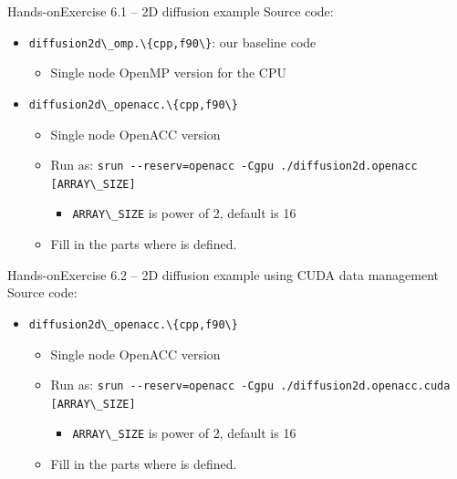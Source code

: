 \documentclass[12pt,aspectratio=169]{beamer}
\newcommand\shinline[2][]{\lstinline[style=shstyle,basicstyle=\ttfamily,#1]!#2!}
\begin{document}
\begin{frame}[fragile]{Hands-on}{Exercise 6.1 -- 2D diffusion example}
  Source code:
  \begin{itemize}
  \item \shinline{diffusion2d\_omp.\{cpp,f90\}}: our baseline code
    \begin{itemize}
    \item Single node OpenMP version for the CPU
    \end{itemize}
  \item \shinline{diffusion2d\_openacc.\{cpp,f90\}}
    \begin{itemize}
    \item Single node OpenACC version
      \item Run as: \shinline{srun --reserv=openacc -Cgpu ./diffusion2d.openacc [ARRAY\_SIZE]}
        \begin{itemize}
        \item \shinline{ARRAY\_SIZE} is power of 2, default is 16
        \end{itemize}
      \item Fill in the parts where  is defined.
    \end{itemize}
  \end{itemize}
\end{frame}

\begin{frame}[fragile]{Hands-on}{Exercise 6.2 -- 2D diffusion example using CUDA data management}
  Source code:
  \begin{itemize}
  \item \shinline{diffusion2d\_openacc.\{cpp,f90\}}
    \begin{itemize}
    \item Single node OpenACC version
      \item Run as: \shinline{srun --reserv=openacc -Cgpu ./diffusion2d.openacc.cuda [ARRAY\_SIZE]}
        \begin{itemize}
        \item \shinline{ARRAY\_SIZE} is power of 2, default is 16
        \end{itemize}
      \item Fill in the parts where  is defined.
    \end{itemize}
  \end{itemize}
\end{frame}
\end{document}
